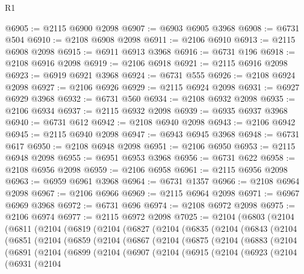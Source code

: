 \begin{lexlean}{R1}
\begin{coremodule}
@6905 := @2115 @6900 @2098
@6907 := @6903 @6905 @3968
@6908 := @6731 @504
@6910 := @2108 @6908 @2098
@6911 := @2106 @6910
@6913 := @2115 @6908 @2098
@6915 := @6911 @6913 @3968
@6916 := @6731 @196
@6918 := @2108 @6916 @2098
@6919 := @2106 @6918
@6921 := @2115 @6916 @2098
@6923 := @6919 @6921 @3968
@6924 := @6731 @555
@6926 := @2108 @6924 @2098
@6927 := @2106 @6926
@6929 := @2115 @6924 @2098
@6931 := @6927 @6929 @3968
@6932 := @6731 @560
@6934 := @2108 @6932 @2098
@6935 := @2106 @6934
@6937 := @2115 @6932 @2098
@6939 := @6935 @6937 @3968
@6940 := @6731 @612
@6942 := @2108 @6940 @2098
@6943 := @2106 @6942
@6945 := @2115 @6940 @2098
@6947 := @6943 @6945 @3968
@6948 := @6731 @617
@6950 := @2108 @6948 @2098
@6951 := @2106 @6950
@6953 := @2115 @6948 @2098
@6955 := @6951 @6953 @3968
@6956 := @6731 @622
@6958 := @2108 @6956 @2098
@6959 := @2106 @6958
@6961 := @2115 @6956 @2098
@6963 := @6959 @6961 @3968
@6964 := @6731 @1357
@6966 := @2108 @6964 @2098
@6967 := @2106 @6966
@6969 := @2115 @6964 @2098
@6971 := @6967 @6969 @3968
@6972 := @6731 @696
@6974 := @2108 @6972 @2098
@6975 := @2106 @6974
@6977 := @2115 @6972 @2098
@7025 := @2104
    (@6803
      (@2104
        (@6811
          (@2104
            (@6819
              (@2104
                (@6827
                  (@2104
                    (@6835
                      (@2104
                        (@6843
                          (@2104
                            (@6851
                              (@2104
                                (@6859
                                  (@2104
                                    (@6867
                                      (@2104
                                        (@6875
                                          (@2104
                                            (@6883
                                              (@2104
                                                (@6891
                                                  (@2104
                                                    (@6899
                                                      (@2104
                                                        (@6907
                                                          (@2104
                                                            (@6915
                                                              (@2104
                                                                (@6923
                                                                  (@2104
                                                                    (@6931
                                                                      (@2104

\end{coremodule}
\end{lexlean}
